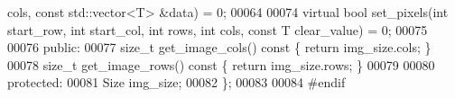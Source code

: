 \begin{DoxyCode}
      cols, \textcolor{keyword}{const} std::vector<T> &data) = 0;
00064 
00074         \textcolor{keyword}{virtual} \textcolor{keywordtype}{bool} set\_pixels(\textcolor{keywordtype}{int} start\_row, \textcolor{keywordtype}{int} start\_col, \textcolor{keywordtype}{int} rows, \textcolor{keywordtype}{int} 
      cols, \textcolor{keyword}{const} T clear\_value) = 0;
00075 
00076 \textcolor{keyword}{public}:
00077         \textcolor{keywordtype}{size\_t} get\_image\_cols()\textcolor{keyword}{ const }\{ \textcolor{keywordflow}{return} img\_size.cols; \}
00078         \textcolor{keywordtype}{size\_t} get\_image\_rows()\textcolor{keyword}{ const }\{ \textcolor{keywordflow}{return} img\_size.rows; \}
00079 
00080 \textcolor{keyword}{protected}:
00081         Size img\_size;
00082 \};
00083 
00084 \textcolor{preprocessor}{#endif}
\end{DoxyCode}
